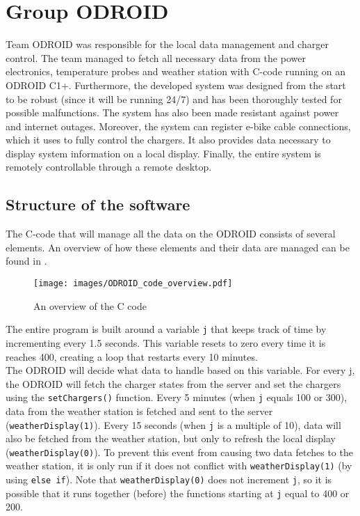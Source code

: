 \section{Group ODROID}\label{sec:ODROID}
Team ODROID was responsible for the local data management and charger control. The team managed to fetch all necessary data from the power electronics, temperature probes and weather station with C-code running on an ODROID C1+. Furthermore, the developed system was designed from the start to be robust (since it will be running 24/7) and has been thoroughly tested for possible malfunctions. The system has also been made resistant against power and internet outages. Moreover, the system can register e-bike cable connections, which it uses to fully control the chargers. It also provides data necessary to display system information on a local display. Finally, the entire system is remotely controllable through a remote desktop.\\

\subsection{Structure of the software}
The C-code that will manage all the data on the ODROID consists of several elements. An overview of how these elements and their data are managed can be found in .\\

\begin{figure}[!ht]
  \centering
    \texttt{[image: images/ODROID\_code\_overview.pdf]}
      \caption{An overview of the C code}\label{fig:code_overview}
\end{figure}

The entire program is built around a variable \verb|j| that keeps track of time by incrementing every 1.5 seconds. This variable resets to zero every time it is reaches 400, creating a loop that restarts every 10 minutes.\\

The ODROID will decide what data to handle based on this variable. For every j, the ODROID will fetch the charger states from the server and set the chargers using the \verb|setChargers()| function. Every 5 minutes (when \verb|j| equals 100 or 300), data from the weather station is fetched and sent to the server (\verb|weatherDisplay(1)|). Every 15 seconds (when \verb|j| is a multiple of 10), data will also be fetched from the weather station, but only to refresh the local display (\verb|weatherDisplay(0)|). To prevent this event from causing two data fetches to the weather station, it is only run if it does not conflict with \verb|weatherDisplay(1)| (by using \verb|else if|). Note that \verb|weatherDisplay(0)| does not increment \verb|j|, so it is possible that it runs together (before) the functions starting at \verb|j| equal to 400 or 200.\\

